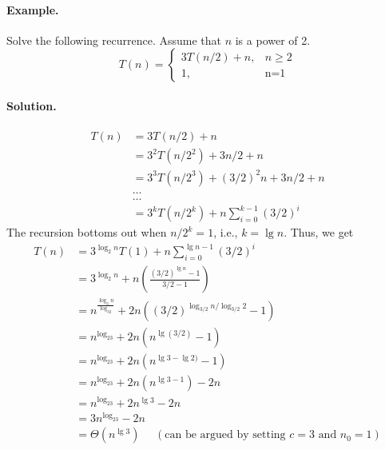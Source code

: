 \documentclass[11pt,twoside]{article}
\begin{document}
\paragraph{Example.} Solve the following recurrence. Assume that $n$
is a power of 2.
\[
T(n) = \left\{ \begin{array}{ll}
      3T(n/2) + n, &  n \geq 2 \\
      1, & \mbox{n=1}
      \end{array} \right.
\]
\paragraph{Solution.}
\begin{align*}
T(n) & =  3T(n/2) + n \\
& =  3^2T(n/2^2) + 3n/2 + n \\ 
& = 3^3T(n/2^3) + (3/2)^2n + 3n/2 + n \\ 
&  \ldots \\
&  \ldots \\
& = 3^kT(n/2^k) + n\sum_{i=0}^{k-1}(3/2)^i 
\end{align*}
\noindent
The recursion bottoms out when $n/2^k = 1$, i.e., $k=\lg n$. Thus, we get
\begin{align*}
T(n) & =  3^{\log_2n}T(1) + n\sum_{i=0}^{\lg n-1}(3/2)^i \\
     & = 3^{\log_2n} + n\left (\frac{(3/2)^{\lg n}-1}{3/2 -1}\right ) \\
     & = n^{\frac{\log_3n}{\log_32}} + 2n((3/2)^{\log_{3/2}n/\log_{3/2}2}-1)\\
     & = n^{\log_23} + 2n(n^{\lg (3/2)}-1) \\
     & = n^{\log_23} + 2n(n^{\lg 3- \lg 2)}-1) \\
     & = n^{\log_23} + 2n(n^{\lg 3-1}) - 2n \\
     & = n^{\log_23} + 2n^{\lg 3} -2n\\
     & = 3n^{\log_23} -2n\\
     & = \Theta(n^{\lg 3}) ~~~~~~ (\mbox{can be argued by setting $c=3$ and $n_0=1$})  
\end{align*}
\end{document}
